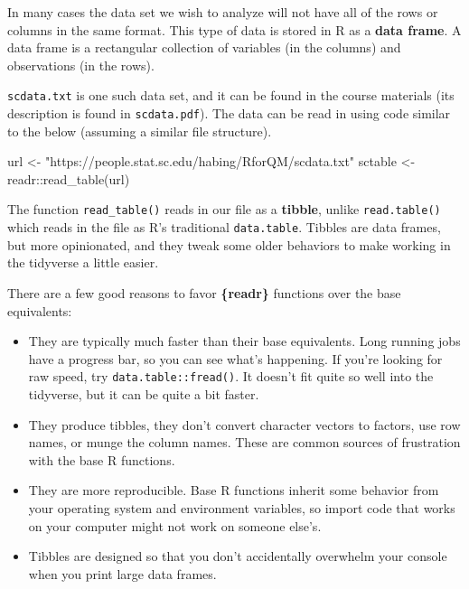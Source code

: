 \documentclass[
]{book}
\newenvironment{Shaded}{\begin{snugshade}}{\end{snugshade}}
\newcommand{\FunctionTok}[1]{\textcolor[rgb]{0.00,0.00,0.00}{#1}}
\newcommand{\NormalTok}[1]{#1}
\newcommand{\OtherTok}[1]{\textcolor[rgb]{0.56,0.35,0.01}{#1}}
\newcommand{\SpecialCharTok}[1]{\textcolor[rgb]{0.00,0.00,0.00}{#1}}
\newcommand{\StringTok}[1]{\textcolor[rgb]{0.31,0.60,0.02}{#1}}
\begin{document}
In many cases the data set we wish to analyze will not have all of the rows or columns in the same format. This type of data is stored in R as a \textbf{data frame}. A data frame is a rectangular collection of variables (in the columns) and observations (in the rows).

\texttt{scdata.txt} is one such data set, and it can be found in the course materials (its description is found in \texttt{scdata.pdf}). The data can be read in using code similar to the below (assuming a similar file structure).

\begin{Shaded}
\begin{Highlighting}[]
\NormalTok{url }\OtherTok{\textless{}{-}} \StringTok{"https://people.stat.sc.edu/habing/RforQM/scdata.txt"}
\NormalTok{sctable }\OtherTok{\textless{}{-}}\NormalTok{ readr}\SpecialCharTok{::}\FunctionTok{read\_table}\NormalTok{(url)}
\end{Highlighting}
\end{Shaded}

The function \texttt{read\_table()} reads in our file as a \textbf{tibble}, unlike \texttt{read.table()} which reads in the file as R's traditional \texttt{data.table}. Tibbles are data frames, but more opinionated, and they tweak some older behaviors to make working in the tidyverse a little easier.

There are a few good reasons to favor \textbf{\{readr\}} functions over the base equivalents:

\begin{itemize}
\item
  They are typically much faster than their base equivalents. Long running jobs have a progress bar, so you can see what's happening. If you're looking for raw speed, try \texttt{data.table::fread()}. It doesn't fit quite so well into the tidyverse, but it can be quite a bit faster.
\item
  They produce tibbles, they don't convert character vectors to factors, use row names, or munge the column names. These are common sources of frustration with the base R functions.
\item
  They are more reproducible. Base R functions inherit some behavior from your operating system and environment variables, so import code that works on your computer might not work on someone else's.
\item
  Tibbles are designed so that you don't accidentally overwhelm your console when you print large data frames.
\end{itemize}
\end{document}
